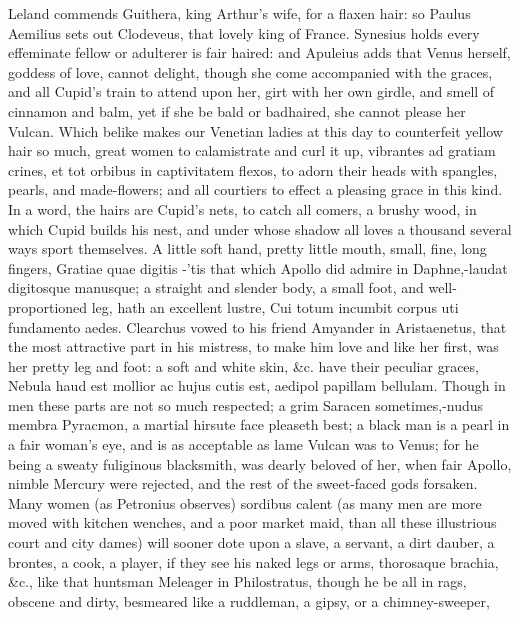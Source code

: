 {Leland commends Guithera, king Arthur's wife, for a flaxen hair: so
Paulus Aemilius sets out Clodeveus, that lovely king of France.
Synesius holds every effeminate fellow or adulterer is fair
haired: and Apuleius adds that Venus herself, goddess of love, cannot
delight, though she come accompanied with the graces, and all
Cupid's train to attend upon her, girt with her own girdle, and smell
of cinnamon and balm, yet if she be bald or badhaired, she cannot
please her Vulcan. Which belike makes our Venetian ladies at this day
to counterfeit yellow hair so much, great women to calamistrate and
curl it up, vibrantes ad gratiam crines, et tot orbibus in captivitatem
flexos, to adorn their heads with spangles, pearls, and made-flowers;
and all courtiers to effect a pleasing grace in this kind. In a word,
the hairs are Cupid's nets, to catch all comers, a brushy wood,
in which Cupid builds his nest, and under whose shadow all loves a
thousand several ways sport themselves.
A little soft hand, pretty little mouth, small, fine, long fingers,
Gratiae quae digitis -'tis that which Apollo did admire in
Daphne,-laudat digitosque manusque; a straight and slender body, a
small foot, and well-proportioned leg, hath an excellent lustre,
Cui totum incumbit corpus uti fundamento aedes. Clearchus vowed
to his friend Amyander in Aristaenetus, that the most attractive
part in his mistress, to make him love and like her first, was her
pretty leg and foot: a soft and white skin, \&c. have their peculiar
graces, Nebula haud est mollior ac hujus cutis est, aedipol
papillam bellulam. Though in men these parts are not so much respected;
a grim Saracen sometimes,-nudus membra Pyracmon, a martial hirsute face
pleaseth best; a black man is a pearl in a fair woman's eye, and is as
acceptable as lame Vulcan was to Venus; for he being a sweaty
fuliginous blacksmith, was dearly beloved of her, when fair Apollo,
nimble Mercury were rejected, and the rest of the sweet-faced gods
forsaken. Many women (as Petronius observes) sordibus calent (as
many men are more moved with kitchen wenches, and a poor market maid,
than all these illustrious court and city dames) will sooner dote upon
a slave, a servant, a dirt dauber, a brontes, a cook, a player, if they
see his naked legs or arms, thorosaque brachia, \&c., like that
huntsman Meleager in Philostratus, though he be all in rags, obscene
and dirty, besmeared like a ruddleman, a gipsy, or a chimney-sweeper,
}
